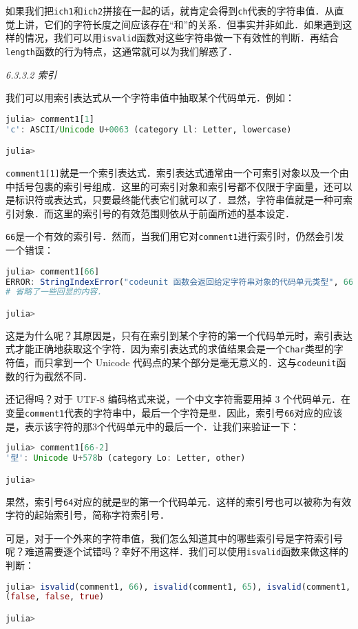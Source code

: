 如果我们把\verb|ich1|和\verb|ich2|拼接在一起的话，就肯定会得到\verb|ch|代表的字符串值．从直觉上讲，它们的字符长度之间应该存在“和”的关系．但事实并非如此．如果遇到这样的情况，我们可以用\verb|isvalid|函数对这些字符串做一下有效性的判断．再结合\verb|length|函数的行为特点，这通常就可以为我们解惑了．

\textsl{6.3.3.2 索引}

我们可以用索引表达式从一个字符串值中抽取某个代码单元．例如：
\begin{lstlisting}[language=julia]
julia> comment1[1]
'c': ASCII/Unicode U+0063 (category Ll: Letter, lowercase)

julia> 
\end{lstlisting}

\verb|comment1[1]|就是一个索引表达式．索引表达式通常由一个可索引对象以及一个由中括号包裹的索引号组成．这里的可索引对象和索引号都不仅限于字面量，还可以是标识符或表达式，只要最终能代表它们就可以了．显然，字符串值就是一种可索引对象．而这里的索引号的有效范围则依从于前面所述的基本设定．

\verb|66|是一个有效的索引号．然而，当我们用它对\verb|comment1|进行索引时，仍然会引发一个错误：
\begin{lstlisting}[language=julia]
julia> comment1[66]
ERROR: StringIndexError("codeunit 函数会返回给定字符串对象的代码单元类型", 66)
# 省略了一些回显的内容．

julia> 
\end{lstlisting}

这是为什么呢？其原因是，只有在索引到某个字符的第一个代码单元时，索引表达式才能正确地获取这个字符．因为索引表达式的求值结果会是一个\verb|Char|类型的字符值，而只拿到一个 Unicode 代码点的某个部分是毫无意义的．这与\verb|codeunit|函数的行为截然不同．

还记得吗？对于 UTF-8 编码格式来说，一个中文字符需要用掉 3 个代码单元．在变量\verb|comment1|代表的字符串中，最后一个字符是\verb|型|．因此，索引号\verb|66|对应的应该是，表示该字符的那3个代码单元中的最后一个．让我们来验证一下：
\begin{lstlisting}[language=julia]
julia> comment1[66-2]
'型': Unicode U+578b (category Lo: Letter, other)

julia> 
\end{lstlisting}

果然，索引号\verb|64|对应的就是\verb|型|的第一个代码单元．这样的索引号也可以被称为有效字符的起始索引号，简称字符索引号．

可是，对于一个外来的字符串值，我们怎么知道其中的哪些索引号是字符索引号呢？难道需要逐个试错吗？幸好不用这样．我们可以使用\verb|isvalid|函数来做这样的判断：
\begin{lstlisting}[language=julia]
julia> isvalid(comment1, 66), isvalid(comment1, 65), isvalid(comment1, 64)
(false, false, true)

julia> 
\end{lstlisting}

